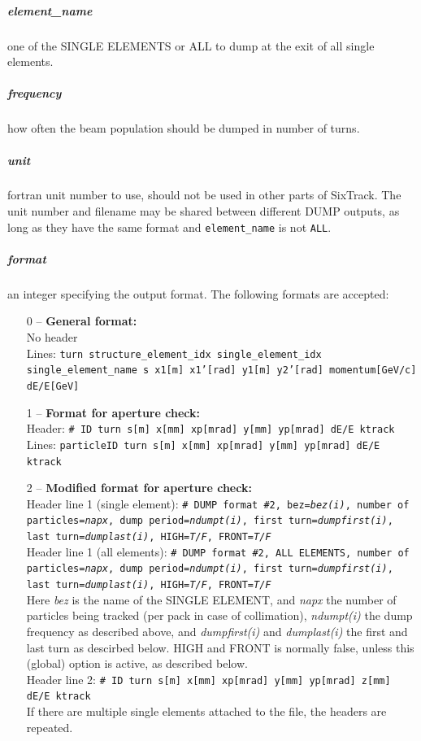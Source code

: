 \documentclass[a4paper,11pt]{report}
\begin{document}
\subparagraph{element\_name}
one of the SINGLE ELEMENTS or ALL to dump at the exit of all single elements.
\subparagraph{frequency}
how often the beam population should be dumped in number of turns.
\subparagraph{unit}
fortran unit number to use, should not be used in other parts of SixTrack.
The unit number and filename may be shared between different DUMP outputs, as long as they have the same format and \texttt{element\_name} is not \texttt{ALL}.
\subparagraph{format}
an integer specifying the output format.
The following formats are accepted:
\begin{enumerate}
	\item[0] -- \textbf{General format:}\\
	No header\\
	Lines: \texttt{turn structure\_element\_idx single\_element\_idx single\_element\_name s x1[m] x1'[rad] y1[m] y2'[rad] momentum[GeV/c] dE/E[GeV]}
	\item[1] -- \textbf{Format for aperture check:}\\
	Header: \texttt{\# ID turn s[m] x[mm] xp[mrad] y[mm] yp[mrad] dE/E ktrack}\\
	Lines: \texttt{particleID turn s[m] x[mm] xp[mrad] y[mm] yp[mrad] dE/E ktrack}
	\item[2] -- \textbf{Modified format for aperture check:}\\
	Header line 1 (single element): \texttt{\# DUMP format \#2, bez=\textit{bez(i)}, number of particles=\textit{napx}, dump period=\textit{ndumpt(i)}, first turn=\textit{dumpfirst(i)}, last turn=\textit{dumplast(i)}, HIGH=\textit{T/F}, FRONT=\textit{T/F}}\\
	Header line 1 (all elements): \texttt{\# DUMP format \#2, ALL ELEMENTS, number of particles=\textit{napx}, dump period=\textit{ndumpt(i)}, first turn=\textit{dumpfirst(i)}, last turn=\textit{dumplast(i)}, HIGH=\textit{T/F}, FRONT=\textit{T/F}}\\
        Here \textit{bez} is the name of the SINGLE ELEMENT, and \textit{napx} the number of particles being tracked (per pack in case of collimation), \textit{ndumpt(i)} the dump frequency as described above, and \textit{dumpfirst(i)} and \textit{dumplast(i)} the first and last turn as descirbed below.
        HIGH and FRONT is normally false, unless this (global) option is active, as described below.\\
	Header line 2: \texttt{\# ID turn s[m] x[mm] xp[mrad] y[mm] yp[mrad] z[mm] dE/E ktrack}\\
        If there are multiple single elements attached to the file, the headers are repeated.\\

\end{enumerate}
\end{document}
